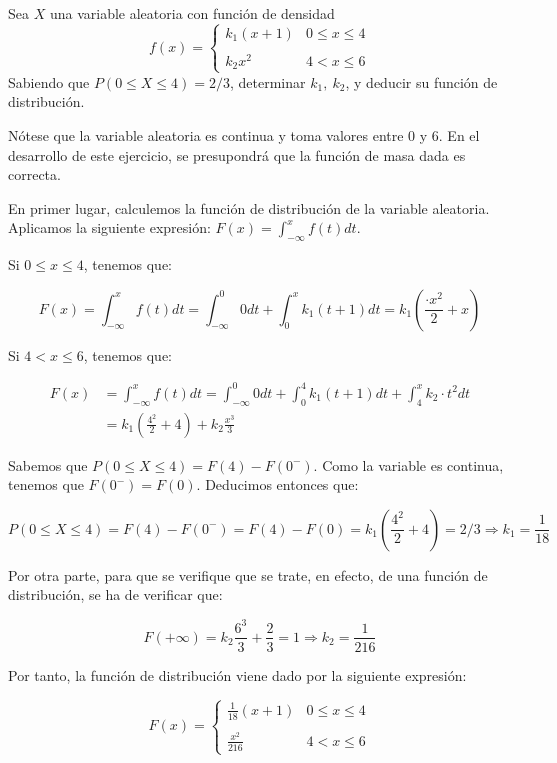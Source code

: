 \problem
Sea $X$ una variable aleatoria con funci{\'o}n de densidad
$$
f(x) = \left \{
\begin{array}{lc}
k_{1} (x+1) & 0 \leq x \leq 4 \\
\\ k_{2} x^{2} & 4 <x \leq 6
\end{array}
\right.
$$
Sabiendo que  $P(0 \leq X \leq 4) = 2/3$,  determinar $k_{1},\ k_{2}$, y
deducir su funci{\'o}n de distribuci{\'o}n.

Nótese que la variable aleatoria es continua y toma valores entre 0 y 6. En el desarrollo de este ejercicio, se presupondrá que la función de masa dada es correcta. 

En primer lugar, calculemos la función de distribución de la variable aleatoria. Aplicamos la siguiente expresión: $F(x) = \int_{-\infty}^x f(t) dt$. 

Si $0 \leq x \leq 4$, tenemos que: 

$$F(x) = \int_{-\infty}^x f(t) dt = \int_{-\infty}^0 0 dt + \int_0^x k_1(t+1)dt = k_1(\frac{·x^2}{2} + x)$$ 

Si $4 < x \leq 6$, tenemos que:

\begin{equation*}
\begin{split}
F(x) & = \int_{-\infty}^x f(t) dt = \int_{-\infty}^0 0 dt + \int_0^4 k_1(t+1)dt + \int_4^x k_2·t^2 dt \\
& = k_1(\frac{4^2}{2} + 4) + k_2\frac{x^3}{3} 
\end{split}
\end{equation*}

Sabemos que $P(0\leq X \leq 4) = F(4) - F(0^-)$. Como la variable es continua, tenemos que $F(0^-) = F(0)$. Deducimos entonces que: 

$$P(0 \leq X \leq 4) = F(4) - F(0^-) = F(4) - F(0) = k_1(\frac{4^2}{2} + 4) = 2/3 \Rightarrow k_1 = \frac{1}{18}$$

Por otra parte, para que se verifique que se trate, en efecto, de una función de distribución, se ha de verificar que: 

$$F(+\infty) = k_2\frac{6^3}{3} + \frac{2}{3} = 1 \Rightarrow k_2 = \frac{1}{216}$$

Por tanto, la función de distribución viene dado por la siguiente expresión: 

$$
F(x) = \left \{
\begin{array}{lc}
\frac{1}{18} (x+1) & 0 \leq x \leq 4 \\
\\ \frac{x^{2}}{216} & 4 <x \leq 6
\end{array}
\right.
$$
